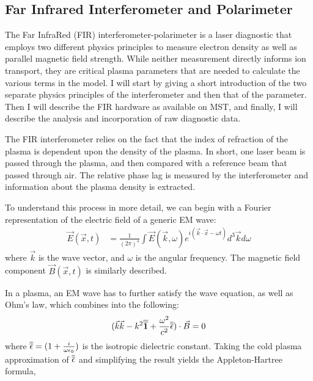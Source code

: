 \subsection{Far Infrared Interferometer and Polarimeter}
The Far InfraRed (FIR) interferometer-polarimeter is a laser diagnostic that employs two different physics principles to measure electron density as well as parallel magnetic field strength. While neither measurement directly informs ion transport, they are critical plasma parameters that are needed to calculate the various terms %
in the model. I will start by giving a short introduction of the two separate physics principles of the interferometer and then that of the parameter. Then I will describe the FIR hardware as available on MST, and finally, I will describe the analysis and incorporation of raw diagnostic data. 

The FIR interferometer relies on the fact that the index of refraction of the plasma is dependent upon the density of the plasma. In short, one laser beam is passed through the plasma, and then compared with a reference beam that passed through air. The relative phase lag is measured by the interferometer and information about the plasma density is extracted. 

To understand this process in more detail, we can begin with a Fourier representation of the electric field of a generic EM wave:
\begin{align}\label{eqn:fir_wave}
    \vec{E}(\vec{x}, t) &= \frac{1}{(2\pi)^4}\int\vec{E}(\vec{k},\omega)e^{i(\vec{k}\cdot\vec{x}-\omega t)}d^3\vec{k}d\omega 
\end{align}
where $\vec{k}$ is the wave vector, and $\omega$ is the angular frequency. The magnetic field component $\vec{B}(\vec{x},t)$ is similarly described.

In a plasma, an EM wave has to further satisfy the wave equation, as well as Ohm's law, which combines into the following:
\begin{align}
    (\vec{k}\vec{k} - k^2\overline{\overline{\textbf{1}}} + \frac{\omega^2}{c^2}\overline{\overline{\epsilon}})\cdot\vec{B} = 0
\end{align}
where $\overline{\overline{\epsilon}} = (1+\frac{i}{\omega\epsilon_0})$ is the isotropic dielectric constant. Taking the cold plasma approximation of $\overline{\overline{\epsilon}}$ and simplifying the result yields the Appleton-Hartree formula\cite{hutchinson_2002},

